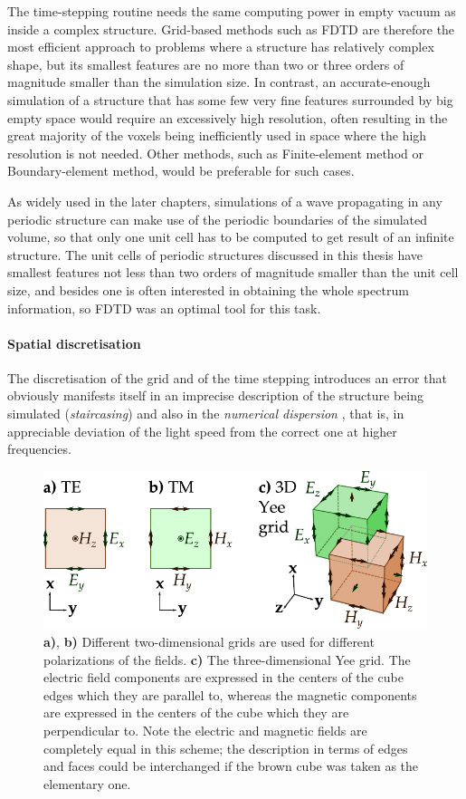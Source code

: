 The time-stepping routine needs the same computing power in empty vacuum as inside a complex structure. Grid-based methods such as FDTD are therefore the most efficient approach to problems where a structure has relatively complex shape, but its smallest features are no more than two or three orders of magnitude smaller than the simulation size. In contrast, an accurate-enough simulation of a structure that has some few very fine features surrounded by big empty space would require an excessively high resolution, often resulting in the great majority of the voxels being inefficiently used in space where the high resolution is not needed. Other methods, %
such as Finite-element method or Boundary-element method, would be preferable for such cases.

As widely used in the later chapters,  %
simulations of a wave propagating in any periodic structure can make use of the periodic boundaries of the simulated volume, so that only one unit cell has to be computed to get result of an infinite structure. The unit cells of periodic structures discussed in this thesis have smallest features not less than two orders of magnitude smaller than the unit cell size, and besides one is often interested in obtaining the whole spectrum information, so FDTD was an optimal tool for this task.
\paragraph{Spatial discretisation} %
The discretisation of the grid and of the time stepping introduces an error that obviously manifests itself in an imprecise description of the structure being simulated (\textit{staircasing}) and also in the \textit{numerical dispersion} \cite{taflove2005book}, that is, in appreciable deviation of the light speed from the correct one at higher frequencies.  %
\begin{figure}[ht] \caption{\textbf{a)}, \textbf{b)} Different two-dimensional grids are used for different polarizations of the fields. \textbf{c)} The three-dimensional Yee grid. The electric field components are expressed in the centers of the cube edges which they are parallel to, whereas the magnetic components are expressed in the centers of the cube which they are perpendicular to. Note the electric and magnetic fields are completely equal in this scheme; the description in terms of edges and faces could be interchanged if the brown cube was taken as the elementary one.} \label{fg_fdtd_yee} \centering 
	\includegraphics[width=12cm]{img/FDTD_Yee_grid_2d-3d.pdf}
\end{figure}

